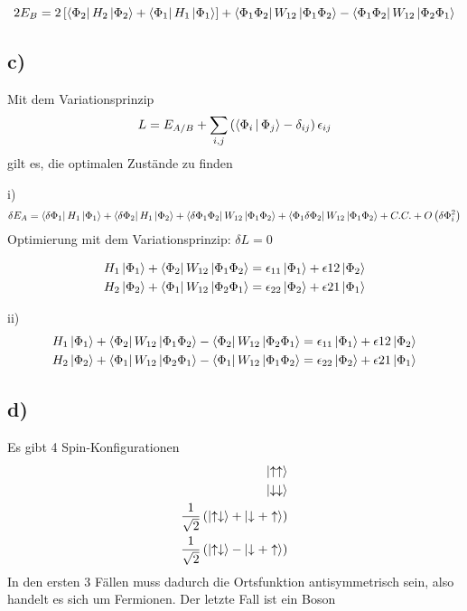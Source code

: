 \begin{equation}
2 E_B = 2 \left[ \Bra{\Phi_2} H_2 \Ket{\Phi_2} + \Bra{\Phi_1} H_1 \Ket{\Phi_1} \right] + \Bra{\Phi_1 \Phi_2} W_{12} \Ket{\Phi_1 \Phi_2} - \Bra{\Phi_1 \Phi_2} W_{12} \Ket{\Phi_2 \Phi_1} 
\end{equation}

\subsection{c)}

Mit dem Variationsprinzip
\begin{equation}
L = E_{A/B} + \sum_{i,j} \left( \Braket{\Phi_i|\Phi_j} - \delta_{ij} \right) \epsilon_{ij}
\end{equation}
gilt es, die optimalen Zust\"ande zu finden

i)
\begin{equation}
\delta E_A = \Bra{\delta \Phi_1} H_1 \Ket{\Phi_1} + \Bra{\delta \Phi_2} H_1 \Ket{\Phi_2} + \Bra{\delta \Phi_1 \Phi_2} W_{12} \Ket{\Phi_1 \Phi_2} + \Bra{\Phi_1 \delta \Phi_2} W_{12} \Ket{\Phi_1 \Phi_2} + \\
 C.C. + O \left(\delta \Phi_i^2 \right)
\end{equation}
Optimierung mit dem Variationsprinzip: $\delta L = 0$

\begin{align}
H_1 \Ket{\Phi_1} + \Bra{\Phi_2} W_{12} \Ket{\Phi_1 \Phi_2} = \epsilon_{11} \Ket{\Phi_1} + \epsilon{12} \Ket{\Phi_2} \\
H_2 \Ket{\Phi_2} + \Bra{\Phi_1} W_{12} \Ket{\Phi_2 \Phi_1} = \epsilon_{22} \Ket{\Phi_2} + \epsilon{21} \Ket{\Phi_1} 
\end{align}

ii)
\begin{align}
H_1 \Ket{\Phi_1} + \Bra{\Phi_2} W_{12} \Ket{\Phi_1 \Phi_2} - \Bra{\Phi_2} W_{12} \Ket{\Phi_2 \Phi_1} = \epsilon_{11} \Ket{\Phi_1} + \epsilon{12} \Ket{\Phi_2} \\
H_2 \Ket{\Phi_2} + \Bra{\Phi_1} W_{12} \Ket{\Phi_2 \Phi_1} - \Bra{\Phi_1} W_{12} \Ket{\Phi_1 \Phi_2} = \epsilon_{22} \Ket{\Phi_2} + \epsilon{21} \Ket{\Phi_1} 
\end{align}

\subsection{d)}

Es gibt 4 Spin-Konfigurationen
\begin{align}
\Ket{\uparrow \uparrow} \\
\Ket{\downarrow \downarrow} \\
\frac{1}{\sqrt{2}} \left( \Ket{ \uparrow \downarrow} + \Ket{ \downarrow + \uparrow} \right) \\
\frac{1}{\sqrt{2}} \left( \Ket{ \uparrow \downarrow} - \Ket{ \downarrow + \uparrow} \right)
\end{align}
In den ersten 3 F\"allen muss dadurch die Ortsfunktion antisymmetrisch sein, also handelt es sich um Fermionen. Der letzte Fall ist ein Boson
